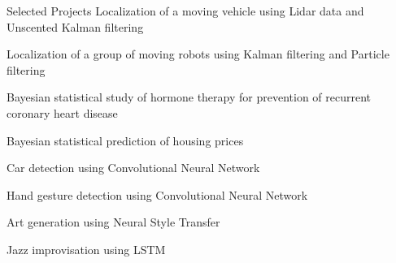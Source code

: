 \begin{rSection}{Selected Projects}
Localization of a moving vehicle using Lidar data and Unscented Kalman filtering

Localization of a group of moving robots using Kalman filtering and Particle filtering

Bayesian statistical study of hormone therapy for prevention of recurrent coronary heart disease

Bayesian statistical prediction of housing prices

Car detection using Convolutional Neural Network

Hand gesture detection using Convolutional Neural Network

Art generation using Neural Style Transfer

Jazz improvisation using LSTM
\end{rSection}